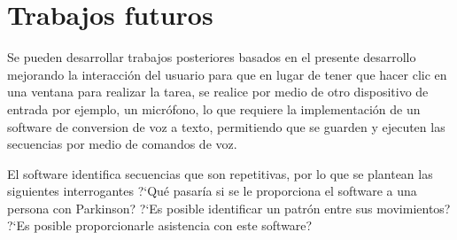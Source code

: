 \section{Trabajos futuros}
Se pueden desarrollar trabajos posteriores basados en el presente desarrollo
 mejorando la interacci\'on del usuario para que en lugar de tener que hacer 
 clic en una ventana para realizar la tarea, se realice por medio de otro 
 dispositivo de entrada por ejemplo, un micr\'ofono, lo que requiere la 
 implementaci\'on de un software de conversion de voz a texto, permitiendo que 
 se guarden y ejecuten las secuencias por medio de comandos de voz. 

El software identifica secuencias que son repetitivas, por lo que se 
 plantean las siguientes interrogantes ?`Qu\'e pasar\'ia si se le 
 proporciona el software a una persona con Parkinson?  
 ?`Es posible identificar un patr\'on entre sus movimientos? 
 ?`Es posible proporcionarle asistencia con este software?
